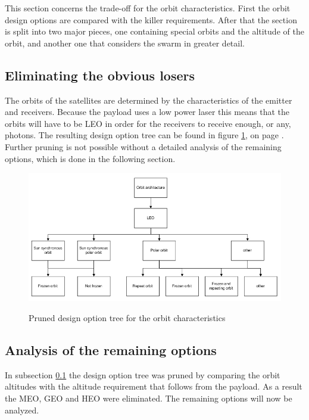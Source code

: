 This section concerns the trade-off for the orbit characteristics. First the orbit design options are compared with the killer requirements. After that the section is split into two major pieces, one containing special orbits and the altitude of the orbit, and another one that considers the swarm in greater detail.
\label{AnalOrb}

\subsection{Eliminating the obvious losers}
\label{pruneOrbit}
The orbits of the satellites are determined by the characteristics of the emitter and receivers. Because the payload uses a low power laser this means that the orbits will have to be \ac{LEO} in order for the receivers to receive enough, or any, photons. The resulting design option tree can be found in figure \ref{fig:pruneOrbit}, on page \pageref{fig:pruneOrbit}. Further pruning is not possible without a detailed analysis of the remaining options, which is done in the following section.

\begin{figure}[b]
\centering
\includegraphics[width=1.0\textwidth, angle=0]{chapters/img/PrunedOrbit.jpg}
\label{fig:pruneOrbit}
\caption{Pruned design option tree for the orbit characteristics}
\end{figure}

\subsection{Analysis of the remaining options}
\label{AnalSpOrb}

In subsection \ref{pruneOrbit} the design option tree was pruned by comparing the orbit altitudes with the altitude requirement that follows from the payload. As a result the \acs{MEO}, \acs{GEO} and \acs{HEO} were eliminated. The remaining options will now be analyzed.

